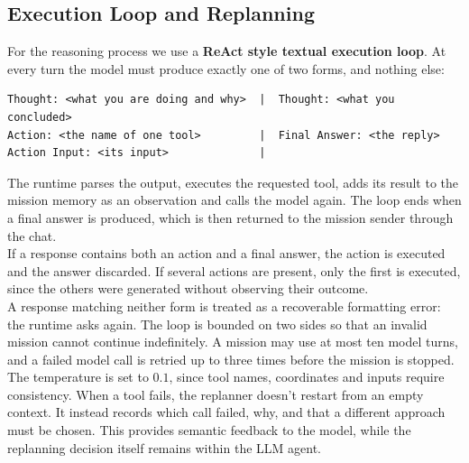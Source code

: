 \documentclass[11pt,a4paper]{article}
\begin{document}
\subsection{Execution Loop and Replanning}
For the reasoning process we use a \textbf{ReAct style textual execution loop}. 
At every turn the model must produce exactly one of two forms, and nothing else:
\begin{verbatim}
Thought: <what you are doing and why>  |  Thought: <what you concluded>
Action: <the name of one tool>         |  Final Answer: <the reply>
Action Input: <its input>              |
\end{verbatim}
The runtime parses the output, executes the requested tool, adds its result to the mission memory as an observation and calls the model again. 
The loop ends when a final answer is produced, which is then returned to the mission sender through the chat.
\\If a response contains both an action and a final answer, the action is executed and the answer discarded.
If several actions are present, only the first is executed, since the others were generated without observing their outcome.
\\A response matching neither form is treated as a recoverable formatting error: the runtime asks again.
The loop is bounded on two sides so that an invalid mission cannot continue indefinitely.
A mission may use at most ten model turns, and a failed model call is retried up to three times before the mission is stopped.
\\The temperature is set to $0.1$, since tool names, coordinates and inputs require consistency.
When a tool fails, the replanner doesn't restart from an empty context. It instead records which call failed, why, and that a different approach must be chosen.
This provides semantic feedback to the model, while the replanning decision itself remains within the LLM agent.
\end{document}
